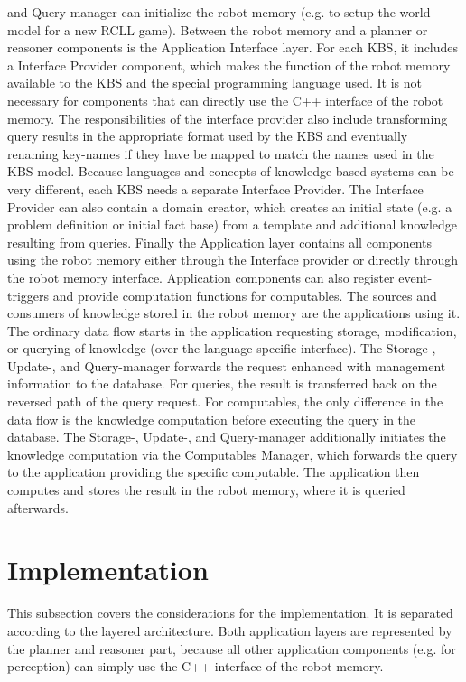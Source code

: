 and Query-manager can initialize the robot memory (e.g. to setup the
world model for a new RCLL game).
Between the robot memory and a planner or reasoner components is the
Application Interface layer. For each KBS, it includes a
Interface Provider component, which makes the function of the robot
memory available to the KBS and the special programming language
used. It is not necessary for components that can directly use the C++
interface of the robot memory. The responsibilities of the interface
provider also include transforming query results in the appropriate
format used by the KBS and eventually renaming key-names if they
have be mapped to match the names used in the KBS
model. Because languages and concepts of knowledge based systems can be
very different, each KBS needs a separate Interface
Provider. The Interface Provider can also contain a domain creator,
which creates an initial state (e.g. a problem definition or initial
fact base) from a template and additional knowledge resulting from
queries. Finally the Application layer contains all components using
the robot memory either through the Interface provider or directly
through the robot memory interface. Application components can also
register event-triggers and provide computation functions for
computables. The sources and consumers of knowledge stored in the
robot memory are the applications using it. The ordinary data flow
starts in the application requesting storage, modification, or
querying of knowledge (over the language specific interface). The
Storage-, Update-, and Query-manager forwards the request enhanced
with management information to the database. For queries, the result
is transferred back on the reversed path of the query request. For
computables, the only difference in the data flow is the knowledge
computation before executing the query in the database. The Storage-,
Update-, and Query-manager additionally initiates the knowledge
computation via the Computables Manager, which forwards the query to
the application providing the specific computable. The application
then computes and stores the result in the robot memory, where it is
queried afterwards.


\section{Implementation}
\label{sec:impl}
This subsection covers the considerations for the implementation. It is
separated according to the layered architecture. Both application
layers are represented by the planner and reasoner part, because all
other application components (e.g. for perception) can simply use the
C++ interface of the robot memory.

